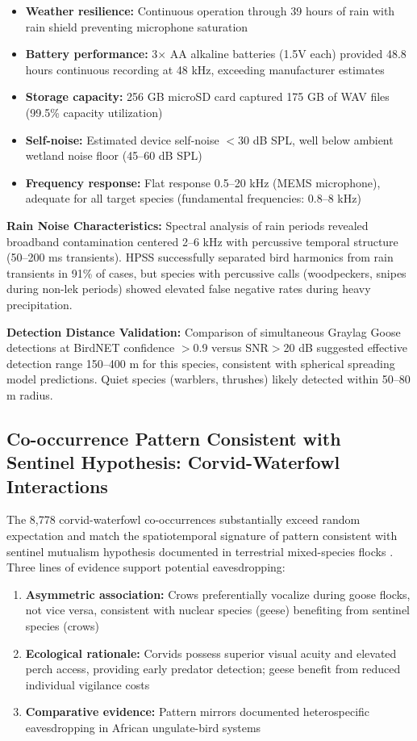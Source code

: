 \documentclass[twocolumn]{article}
\begin{document}
\begin{itemize}
\item \textbf{Weather resilience:} Continuous operation through 39 hours of rain with rain shield preventing microphone saturation
\item \textbf{Battery performance:} 3× AA alkaline batteries (1.5V each) provided 48.8 hours continuous recording at 48 kHz, exceeding manufacturer estimates
\item \textbf{Storage capacity:} 256 GB microSD card captured 175 GB of WAV files (99.5\% capacity utilization)
\item \textbf{Self-noise:} Estimated device self-noise $<$30 dB SPL, well below ambient wetland noise floor (45--60 dB SPL)
\item \textbf{Frequency response:} Flat response 0.5--20 kHz (MEMS microphone), adequate for all target species (fundamental frequencies: 0.8--8 kHz)
\end{itemize}

\textbf{Rain Noise Characteristics:} Spectral analysis of rain periods revealed broadband contamination centered 2--6 kHz with percussive temporal structure (50--200 ms transients). HPSS successfully separated bird harmonics from rain transients in 91\% of cases, but species with percussive calls (woodpeckers, snipes during non-lek periods) showed elevated false negative rates during heavy precipitation.

\textbf{Detection Distance Validation:} Comparison of simultaneous Graylag Goose detections at BirdNET confidence $>$0.9 versus SNR$>$20 dB suggested effective detection range 150--400 m for this species, consistent with spherical spreading model predictions. Quiet species (warblers, thrushes) likely detected within 50--80 m radius.

\subsection{Co-occurrence Pattern Consistent with Sentinel Hypothesis: Corvid-Waterfowl Interactions}

The 8,778 corvid-waterfowl co-occurrences substantially exceed random expectation and match the spatiotemporal signature of pattern consistent with sentinel mutualism hypothesis documented in terrestrial mixed-species flocks \citep{Magrath2015}. Three lines of evidence support potential eavesdropping:

\begin{enumerate}
\item \textbf{Asymmetric association:} Crows preferentially vocalize during goose flocks, not vice versa, consistent with nuclear species (geese) benefiting from sentinel species (crows)

\item \textbf{Ecological rationale:} Corvids possess superior visual acuity and elevated perch access, providing early predator detection; geese benefit from reduced individual vigilance costs \citep{King2023}

\item \textbf{Comparative evidence:} Pattern mirrors documented heterospecific eavesdropping in African ungulate-bird systems \citep{Ridley2007}
\end{enumerate}
\end{document}

